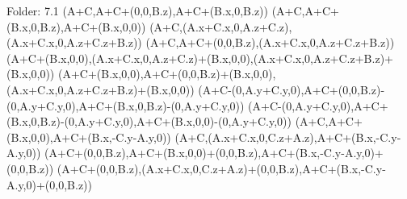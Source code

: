 Folder: 7.1
\left(A+C,A+C+\left(0,0,B.z\right),A+C+\left(B.x,0,B.z\right)\right)
\left(A+C,A+C+\left(B.x,0,B.z\right),A+C+\left(B.x,0,0\right)\right)
\left(A+C,\left(A.x+C.x,0,A.z+C.z\right),\left(A.x+C.x,0,A.z+C.z+B.z\right)\right)
\left(A+C,A+C+\left(0,0,B.z\right),\left(A.x+C.x,0,A.z+C.z+B.z\right)\right)
\left(A+C+\left(B.x,0,0\right),\left(A.x+C.x,0,A.z+C.z\right)+\left(B.x,0,0\right),\left(A.x+C.x,0,A.z+C.z+B.z\right)+\left(B.x,0,0\right)\right)
\left(A+C+\left(B.x,0,0\right),A+C+\left(0,0,B.z\right)+\left(B.x,0,0\right),\left(A.x+C.x,0,A.z+C.z+B.z\right)+\left(B.x,0,0\right)\right)
\left(A+C-\left(0,A.y+C.y,0\right),A+C+\left(0,0,B.z\right)-\left(0,A.y+C.y,0\right),A+C+\left(B.x,0,B.z\right)-\left(0,A.y+C.y,0\right)\right)
\left(A+C-\left(0,A.y+C.y,0\right),A+C+\left(B.x,0,B.z\right)-\left(0,A.y+C.y,0\right),A+C+\left(B.x,0,0\right)-\left(0,A.y+C.y,0\right)\right)
\left(A+C,A+C+\left(B.x,0,0\right),A+C+\left(B.x,-C.y-A.y,0\right)\right)
\left(A+C,\left(A.x+C.x,0,C.z+A.z\right),A+C+\left(B.x,-C.y-A.y,0\right)\right)
\left(A+C+\left(0,0,B.z\right),A+C+\left(B.x,0,0\right)+\left(0,0,B.z\right),A+C+\left(B.x,-C.y-A.y,0\right)+\left(0,0,B.z\right)\right)
\left(A+C+\left(0,0,B.z\right),\left(A.x+C.x,0,C.z+A.z\right)+\left(0,0,B.z\right),A+C+\left(B.x,-C.y-A.y,0\right)+\left(0,0,B.z\right)\right)


